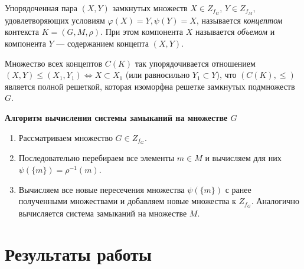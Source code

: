 \documentclass[spec, och, labwork]{shiza}
\begin{document}
    Упорядоченная пара $(X,Y)$ замкнутых множеств $X\in Z_{f_G}$, $Y\in Z_{f_M}$,
    удовлетворяющих условиям $\varphi(X)=Y, \psi(Y)=X$, называется \textit{концептом}
    контекста $K=(G,M,\rho)$. При этом компонента $X$ называется \textit{объемом} и
    компонента $Y$ --- содержанием концепта $(X,Y)$.
    
    Множество всех концептов $C(K)$ так упорядочивается отношением $(X,Y)\le(X_1,Y_1) \Leftrightarrow X \subset X_1$
    (или равносильно $Y_1 \subset Y$), что $(C(K),\le)$ является полной решеткой,
    которая изоморфна решетке замкнутых подмножеств $G$.
    
    \textbf{Алгоритм вычисления системы замыканий на множестве $G$}
    \begin{enumerate}
        \item Рассматриваем множество $G \in Z_{f_G}$.
        \item Последовательно перебираем все элементы $m \in M$ и вычисляем для них $\psi(\{m\}) = \rho^{-1}(m)$.
        \item Вычисляем все новые пересечения множества $\psi(\{m\})$ с ранее полученными множествами и добавляем новые множества к $Z_{f_G}$. Аналогично вычисляется система замыканий на множестве $M$.
    \end{enumerate}
\section{Результаты работы}
\end{document}
